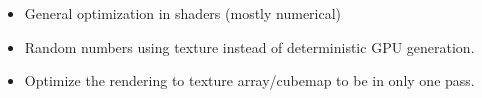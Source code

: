 \documentclass[12pt, twoside,a4paper]{article}
\begin{document}
\begin{itemize}
	\item General optimization in shaders (mostly numerical)
	\item Random numbers using texture instead of deterministic GPU generation.
	\item Optimize the rendering to texture array/cubemap to be in only one pass.
\end{itemize}
%
%
%
%
%
%
%
%
%
%
%
\end{document}
